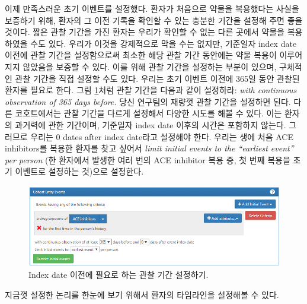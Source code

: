 \documentclass[10.5pt]{book}
\theoremstyle{definition}
\theoremstyle{definition}
\theoremstyle{definition}
\theoremstyle{remark}
\begin{document}
이제 만족스러운 초기 이벤트를 설정했다. 환자가 처음으로 약물을
복용했다는 사실을 보증하기 위해, 환자의 그 이전 기록을 확인할 수 있는
충분한 기간을 설정해 주면 좋을 것이다. 짧은 관찰 기간을 가진 환자는
우리가 확인할 수 없는 다른 곳에서 약물을 복용하였을 수도 있다. 우리가
이것을 강제적으로 막을 수는 없지만, 기준일자 index date 이전에 관찰
기간을 설정함으로써 최소한 해당 관찰 기간 동안에는 약물 복용이
이루어지지 않았음을 보증할 수 있다. 이를 위해 관찰 기간을 설정하는
부분이 있으며, 구체적인 관찰 기간을 직접 설정할 수도 있다. 우리는 초기
이벤트 이전에 365일 동안 관찰된 환자를 필요로 한다. 그림
\ref{fig:initialEventAce}처럼 관찰 기간을 다음과 같이 설정하라:
\emph{with continuous observation of 365 days before.} 당신 연구팀의
재량껏 관찰 기간을 설정하면 된다. 다른 코호트에서는 관찰 기간을 다르게
설정해서 다양한 시도를 해볼 수 있다. 이는 환자의 과거력에 관한 기간이며,
기준일자 index date 이후의 시간은 포함하지 않는다. 그러므로 우리는 0
dates after index date라고 설정해야 한다. 우리는 생에 처음 ACE
inhibitors를 복용한 환자를 찾고 싶어서 \emph{limit initial events to the
``earliest event'' per person} (한 환자에서 발생한 여러 번의 ACE
inhibitor 복용 중, 첫 번째 복용을 초기 이벤트로 설정하는 것)으로
설정한다.

\begin{figure}

{\centering \includegraphics[width=1\linewidth]{images/Cohorts/initialEventAce} 

}

\caption{Index date 이전에 필요로 하는 관찰 기간 설정하기.}\label{fig:initialEventAce}
\end{figure}

지금껏 설정한 논리를 한눈에 보기 위해서 환자의 타임라인을 설정해볼 수
있다.
\end{document}
